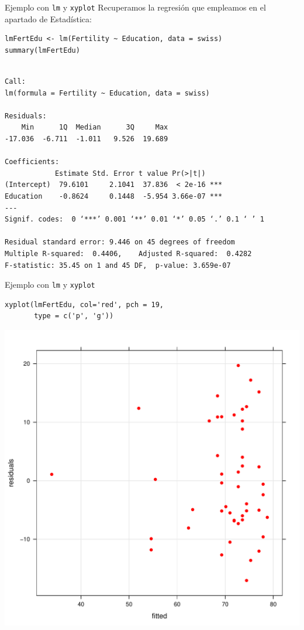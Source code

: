 \documentclass[xcolor={usenames,svgnames,dvipsnames}]{beamer}
\begin{document}
\begin{frame}[fragile,label={sec:orgd681982}]{Ejemplo con \texttt{lm} y \texttt{xyplot}}
 Recuperamos la regresión que empleamos en el apartado de Estadística:
\lstset{language=r,label= ,caption= ,captionpos=b,numbers=none}
\begin{lstlisting}
lmFertEdu <- lm(Fertility ~ Education, data = swiss)
summary(lmFertEdu)
\end{lstlisting}

\begin{verbatim}

Call:
lm(formula = Fertility ~ Education, data = swiss)

Residuals:
    Min      1Q  Median      3Q     Max 
-17.036  -6.711  -1.011   9.526  19.689 

Coefficients:
            Estimate Std. Error t value Pr(>|t|)    
(Intercept)  79.6101     2.1041  37.836  < 2e-16 ***
Education    -0.8624     0.1448  -5.954 3.66e-07 ***
---
Signif. codes:  0 ‘***’ 0.001 ‘**’ 0.01 ‘*’ 0.05 ‘.’ 0.1 ‘ ’ 1

Residual standard error: 9.446 on 45 degrees of freedom
Multiple R-squared:  0.4406,	Adjusted R-squared:  0.4282 
F-statistic: 35.45 on 1 and 45 DF,  p-value: 3.659e-07
\end{verbatim}
\end{frame}


\begin{frame}[fragile,label={sec:org3b6f921}]{Ejemplo con \texttt{lm} y \texttt{xyplot}}
 \lstset{language=r,label= ,caption= ,captionpos=b,numbers=none}
\begin{lstlisting}
xyplot(lmFertEdu, col='red', pch = 19,
       type = c('p', 'g'))
\end{lstlisting}
\begin{center}
\includegraphics[height=0.7\textheight]{figs/xyplotS4.pdf}
\end{center}
\end{frame}
\end{document}
